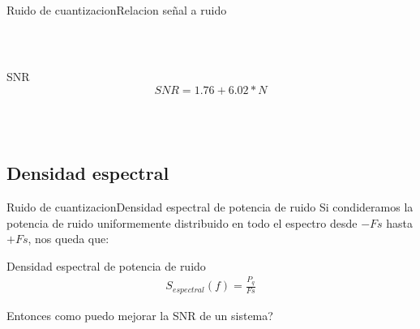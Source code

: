 \begin{darkframes}
\begin{frame}{Ruido de cuantizacion}{Relacion señal a ruido}
\begin{columns}[onlytextwidth]
\begin{align*}
         \end{align*}
      \end{columns}
      \begin{block}{SNR}
         \begin{equation}
            SNR = 1.76 + 6.02 * N
         \end{equation}
      \end{block}
      \begin{centering}
          \\
          \\
      \end{centering}
   \end{frame}
   \subsection{Densidad espectral}
   \begin{frame}{Ruido de cuantizacion}{Densidad espectral de potencia de ruido}
      Si condideramos la potencia de ruido uniformemente distribuido en todo el espectro desde $-Fs$ hasta $+Fs$, nos queda que:
      \begin{block}{Densidad espectral de potencia de ruido}
         \begin{align*}
            S_{espectral}(f) = \frac{P_q}{Fs}
         \end{align*}
      \end{block}
      Entonces como puedo mejorar la SNR de un sistema?
      \vfill
   \end{frame}




















































\end{darkframes}
